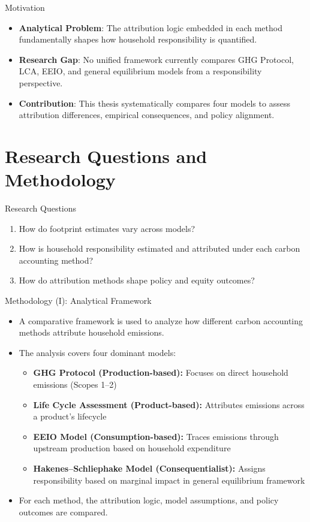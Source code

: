 \documentclass{beamer}
\begin{document}
\begin{frame}{Motivation}
\vspace{1em}
\begin{itemize}
\item \small \textbf{Analytical Problem}: The attribution logic embedded in each method fundamentally shapes how household responsibility is quantified.\\
\item \small \textbf{Research Gap}: No unified framework currently compares GHG Protocol, LCA, EEIO, and general equilibrium models from a responsibility perspective.\\
\item \small \textbf{Contribution}: This thesis systematically compares four models to assess attribution differences, empirical consequences, and policy alignment.
\end{itemize}
\end{frame}



\section{Research Questions and Methodology}
\begin{frame}{Research Questions}
\begin{enumerate}
  \item How do footprint estimates vary across models?
  \item How is household responsibility estimated and attributed under each carbon accounting method?
  \item How do attribution methods shape policy and equity outcomes?
\end{enumerate}
\end{frame}

\begin{frame}{Methodology (I): Analytical Framework}
\small
\vspace{-2.0em}
\begin{itemize}
  \item A comparative framework is used to analyze how different carbon accounting methods attribute household emissions.
  \item The analysis covers four dominant models:
  \begin{itemize}
    \item \textbf{GHG Protocol (Production-based):} Focuses on direct household emissions (Scopes 1–2)
    \item \textbf{Life Cycle Assessment (Product-based):} Attributes emissions across a product's lifecycle
    \item \textbf{EEIO Model (Consumption-based):} Traces emissions through upstream production based on household expenditure
    \item \textbf{Hakenes–Schliephake Model (Consequentialist):} Assigns responsibility based on marginal impact in general equilibrium framework
  \end{itemize}
  \item For each method, the attribution logic, model assumptions, and policy outcomes are compared.
\end{itemize}
\end{frame}
\end{document}
